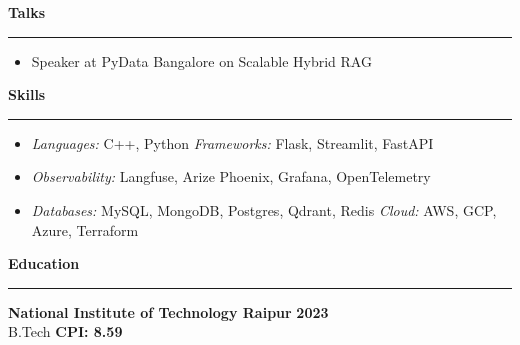 \documentclass{article}%
\begin{document}
\vspace{-1mm}
\begin{flushleft}
\bf{\Large{Talks}}
\end{flushleft}
\vspace{-2mm}
\noindent\rule{\textwidth}{0.4pt}
\vspace{-1mm}
\begin{itemize}
\item Speaker at PyData Bangalore on Scalable Hybrid RAG\hfill
\href{https://www.linkedin.com/posts/pydata-bangalore_pydata-bangalore-machinelearning-activity-7298222664903495680-XK4G?utm_source=share&utm_medium=member_desktop&rcm=ACoAAC3guzgBLJ3ujDvj7NqMMjTw1_2SwpYn4dE}{\faLinkedin}\hspace{2mm}
\href{https://github.com/RheagalFire/Scalable-Hybrid-Rag}{\faGithub}\hspace{2mm}
\href{https://docs.google.com/presentation/d/1a6ENOwzwmHTZ1k66ErT51CDKL4EksXiEYehhHRsKwWU/edit?usp=sharing}{\faFilePowerpoint}
\end{itemize}

\vspace{-1mm}
\begin{flushleft}
\bf{\Large{Skills}}
\end{flushleft}
\vspace{-2mm}
\noindent\rule{\textwidth}{0.4pt}
\vspace{-1mm}
\begin{itemize}
\setlength\itemsep{0.01em}
\item \textit{Languages:} C++, Python \quad \textit{Frameworks:} Flask, Streamlit, FastAPI
\item \textit{Observability:} Langfuse, Arize Phoenix, Grafana, OpenTelemetry
\item \textit{Databases:} MySQL, MongoDB, Postgres, Qdrant, Redis \quad \textit{Cloud:} AWS, GCP, Azure, Terraform
\end{itemize}
\vspace{-1mm}
\begin{flushleft}
\bf{\Large{Education}}
\end{flushleft}
\vspace{-2mm}
\noindent\rule{\textwidth}{0.4pt}
\vspace{1mm}
\noindent
\textbf{National Institute of Technology Raipur} \hfill \textbf{2023} \\
B.Tech \hfill \textbf{CPI: 8.59}
\end{document}

